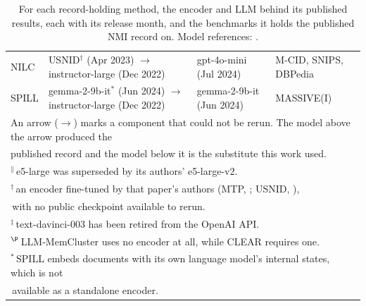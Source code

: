 \documentclass[11pt,a4paper,oneside]{report}
\begin{document}
\begin{table}[htbp]
\begin{tabularx}{\textwidth}{lll>{\raggedright\arraybackslash}X}
\addlinespace[2pt]
NILC & \makecell{{\footnotesize\ttfamily USNID}$^{\dagger}$ {\footnotesize(Apr 2023)} \\ $\to$ {\footnotesize\ttfamily instructor-large} {\footnotesize(Dec 2022)}} & {\footnotesize\ttfamily gpt-4o-mini} {\footnotesize(Jul 2024)} & M-CID, SNIPS, DBPedia \\
\addlinespace[2pt]
SPILL & \makecell{{\footnotesize\ttfamily gemma-2-9b-it}$^{*}$ {\footnotesize(Jun 2024)} \\ $\to$ {\footnotesize\ttfamily instructor-large} {\footnotesize(Dec 2022)}} & {\footnotesize\ttfamily gemma-2-9b-it} {\footnotesize(Jun 2024)} & MASSIVE(I) \\
\bottomrule
\multicolumn{4}{l}{\footnotesize An arrow ($\to$) marks a component that could not be rerun. The model above the arrow produced the} \\
\multicolumn{4}{l}{\footnotesize published record and the model below it is the substitute this work used.} \\
\multicolumn{4}{l}{\footnotesize $^{\|}$\,{\footnotesize\ttfamily e5-large} was superseded by its authors' {\footnotesize\ttfamily e5-large-v2}.} \\
\multicolumn{4}{l}{\footnotesize $^{\dagger}$\,an encoder fine-tuned by that paper's authors ({\footnotesize\ttfamily MTP}, \citealp{zhang2022mtpclnn}; {\footnotesize\ttfamily USNID}, \citealp{zhang2024usnid}),} \\
\multicolumn{4}{l}{\footnotesize \phantom{$^{\dagger}$}\,with no public checkpoint available to rerun.} \\
\multicolumn{4}{l}{\footnotesize $^{\ddagger}$\,{\footnotesize\ttfamily text-davinci-003} has been retired from the OpenAI API.} \\
\multicolumn{4}{l}{\footnotesize $^{\P}$\,LLM-MemCluster uses no encoder at all, while CLEAR requires one.} \\
\multicolumn{4}{l}{\footnotesize $^{*}$\,SPILL embeds documents with its own language model's internal states, which is not} \\
\multicolumn{4}{l}{\footnotesize \phantom{$^{*}$}\,available as a standalone encoder.} \\
\end{tabularx}
\caption[Matched encoder and LLM per record holder]{For each record-holding method, the encoder and LLM behind its published results, each with its release month, and the benchmarks it holds the published NMI record on. Model references: \citealp{su2023instructor,wang2022e5,reimers2019sbert,openai2024embeddings,lee2025gemini,gemmateam2024gemma2,zhang2022mtpclnn,zhang2024usnid,ouyang2022instructgpt,openai2023gpt35,openai2024gpt4o,openai2025gpt41}.}
\label{tab:rq4-sota-stacks}
\end{table}
\end{document}
